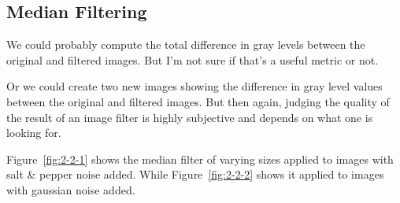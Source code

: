 \subsection{Median Filtering}
We could probably compute the total difference in gray levels between the original and filtered images.
But I'm not sure if that's a useful metric or not.

Or we could create two new images showing the difference in gray level values between the original and filtered images.
But then again, judging the quality of the result of an image filter is highly subjective and depends on what one is looking for.

Figure~\ref{fig:2-2-1} shows the median filter of varying sizes applied to images with salt \& pepper noise added.
While Figure~\ref{fig:2-2-2} shows it applied to images with gaussian noise added.

